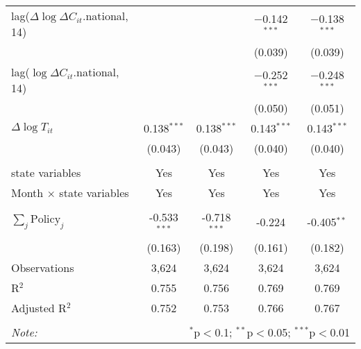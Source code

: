 \begin{tabular}{@{\extracolsep{1pt}}lcccc}
  lag($\Delta \log \Delta C_{it}$.national, 14) &  &  & $-$0.142$^{***}$ & $-$0.138$^{***}$ \\ 
  &  &  & (0.039) & (0.039) \\ 
  lag($\log \Delta C_{it}$.national, 14) &  &  & $-$0.252$^{***}$ & $-$0.248$^{***}$ \\ 
  &  &  & (0.050) & (0.051) \\ 
  $\Delta \log T_{it}$ & 0.138$^{***}$ & 0.138$^{***}$ & 0.143$^{***}$ & 0.143$^{***}$ \\ 
  & (0.043) & (0.043) & (0.040) & (0.040) \\ 
 \hline \\[-1.8ex] 
state variables & Yes & Yes & Yes & Yes \\ 
Month $\times$ state variables & Yes & Yes & Yes & Yes \\ 
\hline \\[-1.8ex] 
$\sum_j \mathrm{Policy}_j$ & -0.533$^{***}$ & -0.718$^{***}$ & -0.224 & -0.405$^{**}$ \\ 
 & (0.163) & (0.198) & (0.161) & (0.182) \\ 
Observations & 3,624 & 3,624 & 3,624 & 3,624 \\ 
R$^{2}$ & 0.755 & 0.756 & 0.769 & 0.769 \\ 
Adjusted R$^{2}$ & 0.752 & 0.753 & 0.766 & 0.767 \\ 
\hline 
\hline \\[-1.8ex] 
\textit{Note:}  & \multicolumn{4}{r}{$^{*}$p$<$0.1; $^{**}$p$<$0.05; $^{***}$p$<$0.01} \\ 
\end{tabular} 